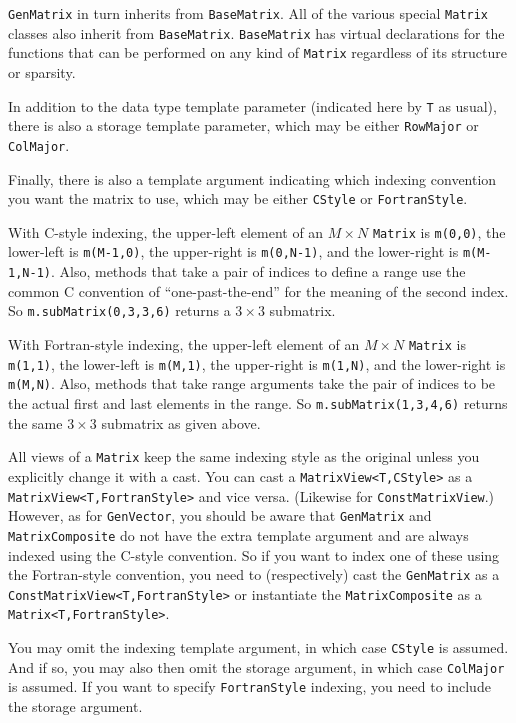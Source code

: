 \documentclass[twoside,letterpaper,11pt]{article}
\renewcommand{\tt}[1]{{\lstinline {#1}}}
\begin{document}
\tt{GenMatrix} in turn inherits from \tt{BaseMatrix}.  All of the various
special \tt{Matrix} classes also inherit from \tt{BaseMatrix}.
\tt{BaseMatrix} has virtual declarations for the functions that can be 
performed on any kind of \tt{Matrix} regardless of its structure or sparsity.

In addition to the data type template parameter (indicated here by \tt{T} as usual),
there is also a storage template parameter, which may be either 
\tt{RowMajor} or \tt{ColMajor}.

Finally, there is also a template argument indicating which indexing convention
you want the matrix to use, which may be either \tt{CStyle} or 
\tt{FortranStyle}.

With C-style indexing, the upper-left element of an $M \times N$ \tt{Matrix} is
\tt{m(0,0)}, the lower-left is \tt{m(M-1,0)}, the upper-right is \tt{m(0,N-1)},
and the lower-right is \tt{m(M-1,N-1)}.  Also, methods that take a pair of 
indices to define a range use the common C convention of ``one-past-the-end'' 
for the meaning of the second index.
So \tt{m.subMatrix(0,3,3,6)} returns a $3 \times 3$ submatrix.

With Fortran-style indexing, the upper-left element of an $M \times N$ \tt{Matrix}
is \tt{m(1,1)}, the lower-left is \tt{m(M,1)}, the upper-right is \tt{m(1,N)},
and the lower-right is \tt{m(M,N)}.  Also, methods that take range arguments
take the pair of indices to be the actual first and last elements in the range.
So \tt{m.subMatrix(1,3,4,6)} returns the same $3 \times 3$ submatrix as given above.

All views of a \tt{Matrix} keep the same indexing style as the original unless you
explicitly change it with a cast.  You can cast a \tt{MatrixView<T,CStyle>}
as a \tt{MatrixView<T,FortranStyle>} and vice versa.  (Likewise for 
\tt{ConstMatrixView}.)  However, as for \tt{GenVector}, you should be
aware that \tt{GenMatrix}
and \tt{MatrixComposite} do not have the extra template argument and are always
indexed using the C-style convention.  So if you want to index one of these 
using the Fortran-style convention, you need to (respectively) cast the 
\tt{GenMatrix} as a \tt{ConstMatrixView<T,FortranStyle>} or instantiate the
\tt{MatrixComposite} as a \tt{Matrix<T,FortranStyle>}.

You may omit the indexing template argument, in which case \tt{CStyle} is assumed.
And if so, you may also then omit the storage argument, in which case \tt{ColMajor}
is assumed.  If you want to specify \tt{FortranStyle} indexing, you need
to include the storage argument.
\end{document}
